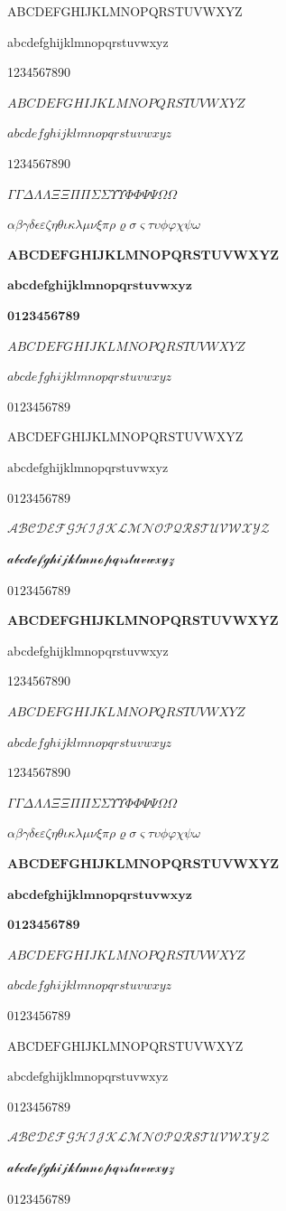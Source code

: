 \documentclass{article}
\begin{document}
ABCDEFGHIJKLMNOPQRSTUVWXYZ

abcdefghijklmnopqrstuvwxyz

1234567890

$ABCDEFGHIJKLMNOPQRSTUVWXYZ$

$abcdefghijklmnopqrstuvwxyz$

$1234567890$

$\Gamma\varGamma\Delta\Lambda\varLambda\Xi\varXi\Pi\varPi\Sigma\varSigma\Upsilon\varUpsilon\Phi\varPhi\Psi\varPsi\Omega\varOmega$

$\alpha\beta\gamma\delta\epsilon\varepsilon\zeta\eta\theta\iota\kappa\lambda\mu\nu\xi\pi\rho\varrho\sigma\varsigma\tau\upsilon\phi\varphi\chi\psi\omega$

$\mathbf{ABCDEFGHIJKLMNOPQRSTUVWXYZ}$

$\mathbf{abcdefghijklmnopqrstuvwxyz}$

$\mathbf{0123456789}$

$\mathit{ABCDEFGHIJKLMNOPQRSTUVWXYZ}$

$\mathit{abcdefghijklmnopqrstuvwxyz}$

$\mathit{0123456789}$

$\mathrm{ABCDEFGHIJKLMNOPQRSTUVWXYZ}$

$\mathrm{abcdefghijklmnopqrstuvwxyz}$

$\mathrm{0123456789}$

$\mathcal{ABCDEFGHIJKLMNOPQRSTUVWXYZ}$

$\mathcal{abcdefghijklmnopqrstuvwxyz}$

$\mathcal{0123456789}$

{\bfseries
ABCDEFGHIJKLMNOPQRSTUVWXYZ

abcdefghijklmnopqrstuvwxyz

1234567890}


$ABCDEFGHIJKLMNOPQRSTUVWXYZ$

$abcdefghijklmnopqrstuvwxyz$

$1234567890$

$\Gamma\varGamma\Delta\Lambda\varLambda\Xi\varXi\Pi\varPi\Sigma\varSigma\Upsilon\varUpsilon\Phi\varPhi\Psi\varPsi\Omega\varOmega$

$\alpha\beta\gamma\delta\epsilon\varepsilon\zeta\eta\theta\iota\kappa\lambda\mu\nu\xi\pi\rho\varrho\sigma\varsigma\tau\upsilon\phi\varphi\chi\psi\omega$

$\mathbf{ABCDEFGHIJKLMNOPQRSTUVWXYZ}$

$\mathbf{abcdefghijklmnopqrstuvwxyz}$

$\mathbf{0123456789}$

$\mathit{ABCDEFGHIJKLMNOPQRSTUVWXYZ}$

$\mathit{abcdefghijklmnopqrstuvwxyz}$

$\mathit{0123456789}$

$\mathrm{ABCDEFGHIJKLMNOPQRSTUVWXYZ}$

$\mathrm{abcdefghijklmnopqrstuvwxyz}$

$\mathrm{0123456789}$

$\mathcal{ABCDEFGHIJKLMNOPQRSTUVWXYZ}$

$\mathcal{abcdefghijklmnopqrstuvwxyz}$

$\mathcal{0123456789}$
\end{document}
